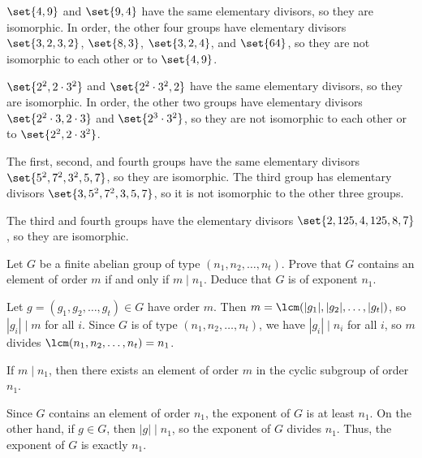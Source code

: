 \begin{solalph}
    \item $\set{4, 9}$ and $\set{9, 4}$ have the same elementary divisors, so they are isomorphic. In order, the other four groups have elementary divisors $\set{3, 2, 3, 2}$, $\set{8, 3}$, $\set{3, 2, 4}$, and $\set{64}$, so they are not isomorphic to each other or to $\set{4, 9}$.
    \item $\set{2^2, 2 \cdot 3^2}$ and $\set{2^2 \cdot 3^2, 2}$ have the same elementary divisors, so they are isomorphic. In order, the other two groups have elementary divisors $\set{2^2 \cdot 3, 2 \cdot 3}$ and $\set{2^3 \cdot 3^2}$, so they are not isomorphic to each other or to $\set{2^2, 2 \cdot 3^2}$.
    \item The first, second, and fourth groups have the same elementary divisors $\set{5^2, 7^2, 3^2, 5, 7}$, so they are isomorphic. The third group has elementary divisors $\set{3, 5^2, 7^2, 3, 5, 7}$, so it is not isomorphic to the other three groups.
    \item The third and fourth groups have the elementary divisors $\set{2, 125, 4, 125, 8, 7}$, so they are isomorphic.
\end{solalph}

\begin{exercise}\label{ex5.2.5}
    Let $G$ be a finite abelian group of type $(n_1, n_2, \ldots, n_t)$. Prove that $G$ contains an element of order $m$ if and only if $m \mid n_1$. Deduce that $G$ is of exponent $n_1$.
\end{exercise}

\begin{sol}
    \leavevmode
    \begin{ifandonlyif}
        \item[\rightimp] Let $g = (g_1, g_2, \ldots, g_t) \in G$ have order $m$. Then $m = \lcm(|g_1|, |g_2|, \ldots, |g_t|)$, so $|g_i| \mid m$ for all $i$. Since $G$ is of type $(n_1, n_2, \ldots, n_t)$, we have $|g_i| \mid n_i$ for all $i$, so $m$ divides $\lcm(n_1, n_2, \ldots, n_t) = n_1$.
        \item[\leftimp] If $m \mid n_1$, then there exists an element of order $m$ in the cyclic subgroup of order $n_1$.
    \end{ifandonlyif}
    Since $G$ contains an element of order $n_1$, the exponent of $G$ is at least $n_1$. On the other hand, if $g \in G$, then $|g| \mid n_1$, so the exponent of $G$ divides $n_1$. Thus, the exponent of $G$ is exactly $n_1$.
\end{sol}

